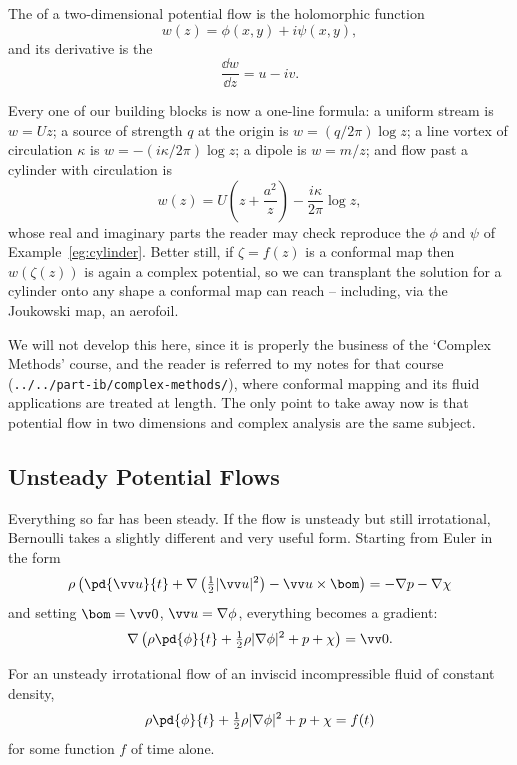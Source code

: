 \begin{definition}
	The  of a two-dimensional potential flow is the holomorphic function
	$$
	w(z) = \phi(x,y) + i \psi(x, y),
	$$
	and its derivative is the 
	$$
	\frac{\dd w}{\dd z} = u - iv.
	$$
\end{definition}

Every one of our building blocks is now a one-line formula: a uniform stream is $w = Uz$; a source of strength $q$ at the origin is $w = (q/2\pi)\log z$; a line vortex of circulation $\kappa$ is $w = -(i\kappa/2\pi)\log z$; a dipole is $w = m/z$; and flow past a cylinder with circulation is
$$
w(z) = U\left(z + \frac{a^2}{z}\right) - \frac{i\kappa}{2\pi}\log z,
$$
whose real and imaginary parts the reader may check reproduce the $\phi$ and $\psi$ of Example~\ref{eg:cylinder}. Better still, if $\zeta = f(z)$ is a conformal map then $w(\zeta(z))$ is again a complex potential, so we can transplant the solution for a cylinder onto any shape a conformal map can reach -- including, via the Joukowski map, an aerofoil.

We will not develop this here, since it is properly the business of the `Complex Methods' course, and the reader is referred to my notes for that course (\texttt{../../part-ib/complex-methods/}), where conformal mapping and its fluid applications are treated at length. The only point to take away now is that potential flow in two dimensions and complex analysis are the same subject.

\subsection{Unsteady Potential Flows}

Everything so far has been steady. If the flow is unsteady but still irrotational, Bernoulli takes a slightly different and very useful form. Starting from Euler in the form
$$
\rho\left(\pd{\vv u}{t} + \nabla\left(\tfrac{1}{2}|\vv u|^2\right) - \vv u \times \bom\right) = -\nabla p - \nabla\chi
$$
and setting $\bom = \vv 0$, $\vv u = \nabla\phi$, everything becomes a gradient:
$$
\nabla\left(\rho\pd{\phi}{t} + \tfrac{1}{2}\rho|\nabla\phi|^2 + p + \chi\right) = \vv 0.
$$

\begin{proposition}
	For an unsteady irrotational flow of an inviscid incompressible fluid of constant density,
	$$
	\rho \pd{\phi}{t} + \tfrac{1}{2}\rho|\nabla\phi|^2 + p + \chi = f(t)
	$$
	for some function $f$ of time alone.
\end{proposition}

